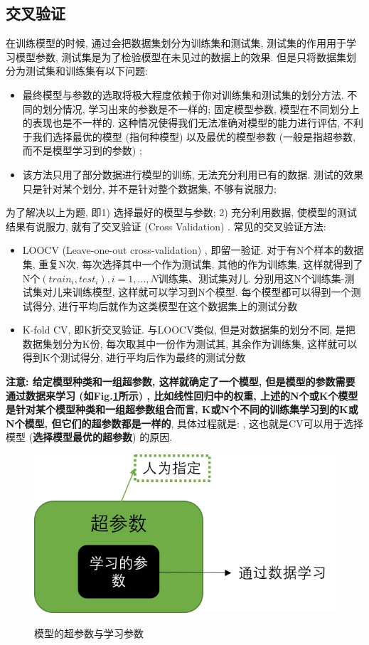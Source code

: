 \subsection{交叉验证}
在训练模型的时候, 通过会把数据集划分为训练集和测试集, 测试集的作用用于学习模型参数, 测试集是为了检验模型在未见过的数据上的效果. 但是只将数据集划分为测试集和训练集有以下问题: 
\begin{itemize}
	\item 最终模型与参数的选取将极大程度依赖于你对训练集和测试集的划分方法. 不同的划分情况, 学习出来的参数是不一样的; 固定模型参数, 模型在不同划分上的表现也是不一样的. 这种情况使得我们无法准确对模型的能力进行评估, 不利于我们选择最优的模型 (指何种模型) 以及最优的模型参数 (一般是指超参数, 而不是模型学习到的参数) ; 
	\item 该方法只用了部分数据进行模型的训练, 无法充分利用已有的数据. 测试的效果只是针对某个划分, 并不是针对整个数据集, 不够有说服力; 
\end{itemize}
为了解决以上为题, 即1) 选择最好的模型与参数; 2) 充分利用数据, 使模型的测试结果有说服力, 就有了交叉验证 (Cross Validation) . 常见的交叉验证方法: 
\begin{itemize}
	\item LOOCV (Leave-one-out cross-validation) , 即留一验证. 对于有N个样本的数据集, 重复N次, 每次选择其中一个作为测试集, 其他的作为训练集, 这样就得到了N个$(train_i, test_i), i = 1, ..., N$训练集、测试集对儿. 分别用这N个训练集-测试集对儿来训练模型, 这样就可以学习到N个模型. 每个模型都可以得到一个测试得分, 进行平均后就作为这类模型在这个数据集上的测试分数
	
	\item K-fold CV, 即K折交叉验证. 与LOOCV类似, 但是对数据集的划分不同, 是把数据集划分为K份, 每次取其中一份作为测试其, 其余作为训练集, 这样就可以得到K个测试得分, 进行平均后作为最终的测试分数
\end{itemize}
\textbf{注意: 给定模型种类和一组超参数, 这样就确定了一个模型, 但是模型的参数需要通过数据来学习 (如Fig.\ref{fig:model}所示) , 比如线性回归中的权重, 上述的N个或K个模型是针对某个模型种类和一组超参数组合而言, K或N个不同的训练集学习到的K或N个模型, 但它们的超参数都是一样的}, 具体过程就是: , 这也就是CV可以用于选择模型 (\textbf{选择模型最优的超参数}) 的原因. 

\begin{figure}[h]
	\centering
	\includegraphics[width=.5\textwidth]{pics/model.png}
	\label{fig:model}
	\caption{模型的超参数与学习参数}
\end{figure}

